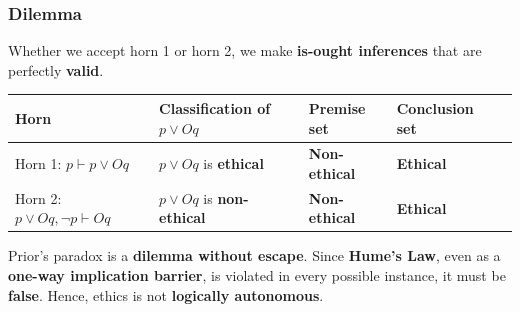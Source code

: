 \documentclass[11pt]{article}
\begin{document}
\subsubsection{Dilemma}
\label{sec:org6b65eaa}
Whether we accept horn 1 or horn 2, we make \textbf{is-ought inferences} that are perfectly \textbf{valid}.
\begin{center}
\begin{tabularx}{\textwidth}{|X|X|X|X|X|}
\hline
Horn & Classification of \(p \vee Oq\) & Premise set & Conclusion set\\
\hline
Horn 1: \(p \vdash p \vee Oq\) & \(p \vee Oq\) is \textbf{ethical} & \textbf{Non-ethical} & \textbf{Ethical}\\
\hline
Horn 2: \(p \vee Oq, \neg p \vdash Oq\) & \(p \vee Oq\) is \textbf{non-ethical} & \textbf{Non-ethical} & \textbf{Ethical}\\
\hline
\end{tabularx}
\end{center}
Prior's paradox is a \textbf{dilemma without escape}. Since \textbf{Hume's Law}, even as a \textbf{one-way implication barrier}, is violated in every possible instance, it must be \textbf{false}. Hence, ethics is not \textbf{logically autonomous}.

 \newpage
\end{document}
